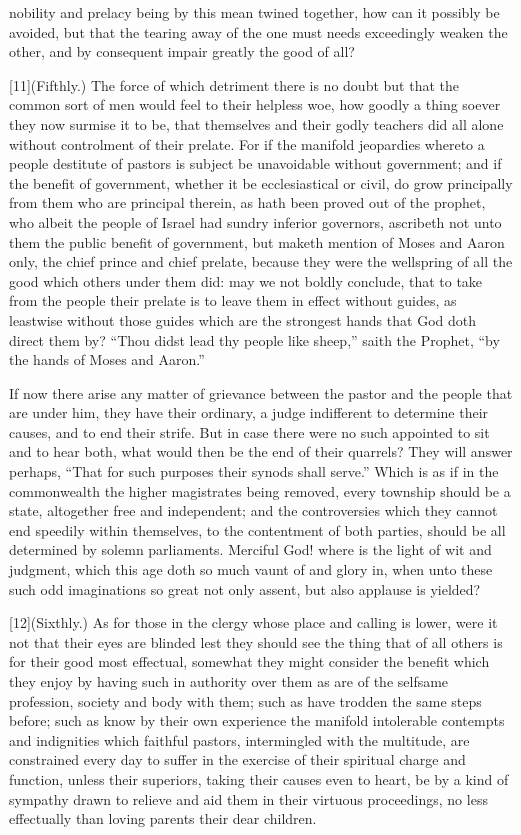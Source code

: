 nobility and prelacy being by this mean twined together, how can it possibly be avoided, but that the tearing away of the one must needs exceedingly weaken the other, and by consequent impair greatly the good of all?

[11](Fifthly.) The force of which detriment there is no doubt but that the common sort of men would feel to their helpless woe, how goodly a thing soever they now surmise it to be, that themselves and their godly teachers did all alone without controlment of their prelate. For if the manifold jeopardies whereto a people destitute of pastors is subject be unavoidable without government; and if the benefit of government,  whether it be ecclesiastical or civil, do grow principally from them who are principal therein, as hath been proved out of the prophet, who albeit the people of Israel had sundry inferior governors, ascribeth not unto them the public benefit of government, but maketh mention of Moses and Aaron only, the chief prince and chief prelate, because they were the wellspring of all the good which others under them did: may we not boldly conclude, that to take from the people their prelate is to leave them in effect without guides, as leastwise without those guides which are the strongest hands that God doth direct them by? “Thou didst lead thy people like sheep,” saith the Prophet, “by the hands of Moses and Aaron.”

If now there arise any matter of grievance between the pastor and the people that are under him, they have their ordinary, a judge indifferent to determine their causes, and to end their strife. But in case there were no such appointed to sit and to hear both, what would then be the end of their quarrels? They will answer perhaps, “That for such purposes their synods shall serve.” Which is as if in the commonwealth the higher magistrates being removed, every township should be a state, altogether free and independent; and the controversies which they cannot end speedily within themselves, to the contentment of both parties, should be all determined by solemn parliaments. Merciful God! where is the light of wit and judgment, which this age doth so much vaunt of and glory in, when unto these such odd imaginations so great not only assent, but also applause is yielded?

[12](Sixthly.) As for those in the clergy whose place and calling is lower, were it not that their eyes are blinded lest they should see the thing that of all others is for their good most effectual, somewhat they might consider the benefit which they enjoy by having such in authority over them as are of the selfsame profession, society and body with them; such as have trodden the same steps before; such as know by their own experience the manifold intolerable contempts and indignities which faithful pastors, intermingled with the multitude, are constrained every day to suffer in the exercise of their spiritual charge and function, unless their superiors, taking their causes even to heart, be by a kind of sympathy drawn to  relieve and aid them in their virtuous proceedings, no less effectually than loving parents their dear children.

